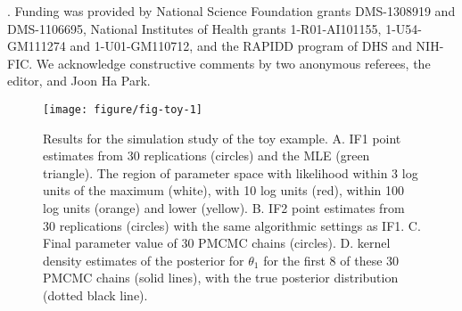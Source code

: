 \documentclass{pnastwo}\usepackage[]{graphicx}\usepackage[]{color}
\newenvironment{knitrout}{}{} %
\begin{document}
\begin{article}
\vspace{3mm}

. Funding was provided by National Science Foundation grants DMS-1308919 and DMS-1106695, National Institutes of Health grants 1-R01-AI101155, 1-U54-GM111274 and 1-U01-GM110712,
 and the RAPIDD program of DHS and NIH-FIC.
We acknowledge constructive comments by two anonymous referees, the editor, and Joon Ha Park.



\end{article}



\begin{figure}
\begin{center}
\begin{knitrout}\scriptsize
{}\color{fgcolor}

\texttt{[image: figure/fig-toy-1]} \hfill{}



\end{knitrout}
\end{center}
\vspace{-0.25cm}
\caption{Results for the simulation study of the toy example. A. IF1 point estimates from 30 replications (circles) and the MLE (green triangle). The region of parameter space with likelihood within 3 log units of the maximum (white), with 10 log units (red), within 100 log units (orange) and lower (yellow). B. IF2 point estimates from 30 replications (circles) with the same algorithmic settings as IF1. C. Final parameter value of 30 PMCMC chains (circles). D. kernel density estimates of the posterior for $\theta_1$ for the first 8 of these 30 PMCMC chains (solid lines), with the true posterior distribution (dotted black line).}\label{fig:toy} 
\end{figure}
\end{document}

